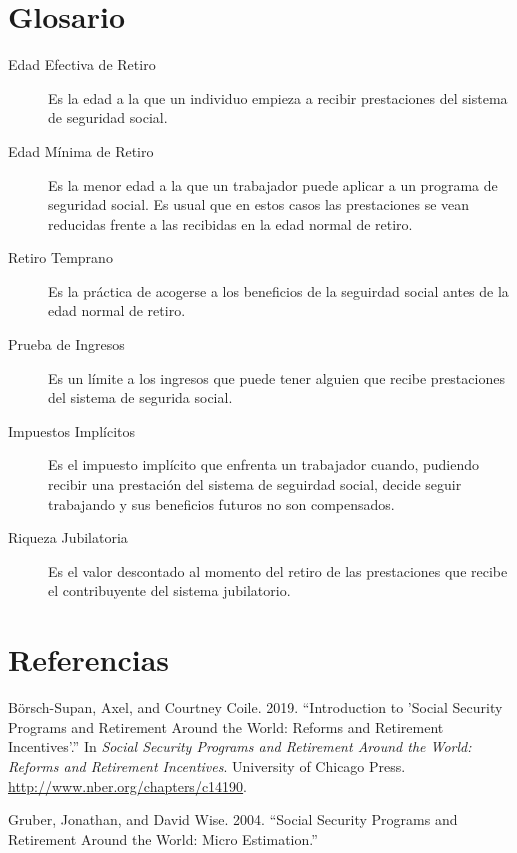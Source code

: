 \documentclass[]{article}
\begin{document}
\hypertarget{glosario}{%
\section{Glosario}\label{glosario}}

\begin{description}
\item[Edad Efectiva de Retiro]
Es la edad a la que un individuo empieza a recibir prestaciones del
sistema de seguridad social.
\item[Edad Mínima de Retiro]
Es la menor edad a la que un trabajador puede aplicar a un programa de
seguridad social. Es usual que en estos casos las prestaciones se vean
reducidas frente a las recibidas en la edad normal de retiro.
\item[Retiro Temprano]
Es la práctica de acogerse a los beneficios de la seguirdad social antes
de la edad normal de retiro.
\item[Prueba de Ingresos]
Es un límite a los ingresos que puede tener alguien que recibe
prestaciones del sistema de segurida social.
\item[Impuestos Implícitos]
Es el impuesto implícito que enfrenta un trabajador cuando, pudiendo
recibir una prestación del sistema de seguirdad social, decide seguir
trabajando y sus beneficios futuros no son compensados.
\item[Riqueza Jubilatoria]
Es el valor descontado al momento del retiro de las prestaciones que
recibe el contribuyente del sistema jubilatorio.
\end{description}

\hypertarget{referencias}{%
\section*{Referencias}\label{referencias}}

\hypertarget{refs}{}
\leavevmode\hypertarget{ref-NBERc14190}{}%
Börsch-Supan, Axel, and Courtney Coile. 2019. ``Introduction to 'Social
Security Programs and Retirement Around the World: Reforms and
Retirement Incentives'.'' In \emph{Social Security Programs and
Retirement Around the World: Reforms and Retirement Incentives}.
University of Chicago Press. \url{http://www.nber.org/chapters/c14190}.

\leavevmode\hypertarget{ref-gruber04}{}%
Gruber, Jonathan, and David Wise. 2004. ``Social Security Programs and
Retirement Around the World: Micro Estimation.''
\end{document}
